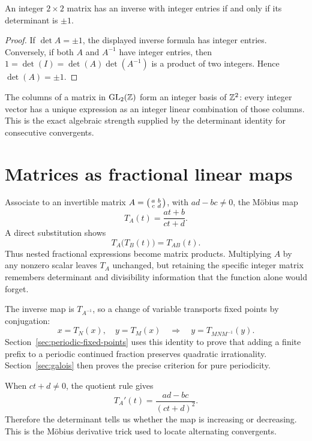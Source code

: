 \begin{proposition}
An integer $2\times2$ matrix has an inverse with integer entries if and only if
its determinant is $\pm1$.
\end{proposition}

\begin{proof}
If $\det A=\pm1$, the displayed inverse formula has integer entries. Conversely,
if both $A$ and $A^{-1}$ have integer entries, then
$1=\det(I)=\det(A)\det(A^{-1})$ is a product of two integers. Hence
$\det(A)=\pm1$.
\end{proof}

\begin{bigidea}
The columns of a matrix in $\operatorname{GL}_2(\mathbb Z)$ form an integer basis of
$\mathbb Z^2$: every integer vector has a unique expression as an integer linear
combination of those columns. This is the exact algebraic strength supplied by
the determinant identity for consecutive convergents.
\end{bigidea}

\section{Matrices as fractional linear maps}

Associate to an invertible matrix
$A=\begin{psmallmatrix}a&b\\c&d\end{psmallmatrix}$, with $ad-bc\ne0$,
the M\"obius map
\[
  T_A(t)=\frac{at+b}{ct+d}.
\]
A direct substitution shows
\[
  T_A\bigl(T_B(t)\bigr)=T_{AB}(t).
\]
Thus nested fractional expressions become matrix products. Multiplying $A$ by
any nonzero scalar leaves $T_A$ unchanged, but retaining the specific integer
matrix remembers determinant and divisibility information that the function
alone would forget.

The inverse map is $T_{A^{-1}}$, so a change of variable transports fixed
points by conjugation:
\[
 x=T_N(x),\quad y=T_M(x)
 \quad\Longrightarrow\quad y=T_{MNM^{-1}}(y).
\]
Section~\ref{sec:periodic-fixed-points} uses this identity to prove that
adding a finite prefix to a periodic continued fraction preserves
quadratic irrationality. Section~\ref{sec:galois} then proves the precise
criterion for pure periodicity.

When $ct+d\ne0$, the quotient rule gives
\[
  T_A'(t)=\frac{ad-bc}{(ct+d)^2}.
\]
Therefore the determinant tells us whether the map is increasing or decreasing.
This is the M\"obius derivative trick used to locate alternating convergents.

